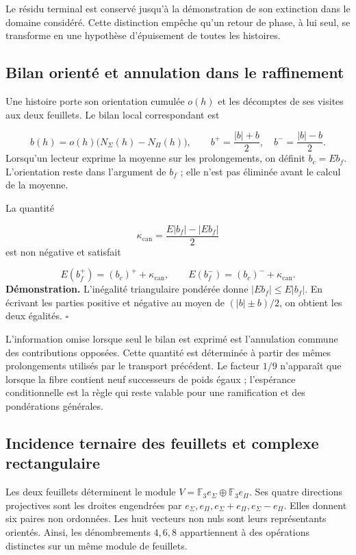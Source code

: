 Le résidu terminal est conservé jusqu'à la démonstration de son extinction dans le domaine considéré. Cette distinction empêche qu'un retour de phase, à lui seul, se transforme en une hypothèse d'épuisement de toutes les histoires.

\subsection{Bilan orienté et annulation dans le raffinement}
Une histoire porte son orientation cumulée \(o(h)\) et les décomptes de ses visites aux deux feuillets. Le bilan local correspondant est

\[
b(h)=o(h)\bigl(N_\Sigma(h)-N_\Pi(h)\bigr),
\qquad
b^+=\frac{|b|+b}{2},\quad b^-=\frac{|b|-b}{2}.
\]
Lorsqu’un lecteur exprime la moyenne sur les prolongements, on définit \(b_c=Eb_f\). L’orientation reste dans l’argument de \(b_f\) ; elle n’est pas éliminée avant le calcul de la moyenne.

La quantité

\[
\kappa_{\mathrm{can}}=
\frac{E|b_f|-|Eb_f|}{2}
\]
est non négative et satisfait

\[
E(b_f^+)=(b_c)^++\kappa_{\mathrm{can}},
\qquad
E(b_f^-)=(b_c)^-+\kappa_{\mathrm{can}}.
\]
\textbf{Démonstration.} L'inégalité triangulaire pondérée donne \(|Eb_f|\leq E|b_f|\). En écrivant les parties positive et négative au moyen de \((|b|\pm b)/2\), on obtient les deux égalités. \hfill\(\square\)

L’information omise lorsque seul le bilan est exprimé est l’annulation commune des contributions opposées. Cette quantité est déterminée à partir des mêmes prolongements utilisés par le transport précédent. Le facteur \(1/9\) n’apparaît que lorsque la fibre contient neuf successeurs de poids égaux ; l’espérance conditionnelle est la règle qui reste valable pour une ramification et des pondérations générales.

\subsection{Incidence ternaire des feuillets et complexe rectangulaire}
Les deux feuillets déterminent le module \(V=\mathbb F_3e_\Sigma\oplus\mathbb F_3e_\Pi\). Ses quatre directions projectives sont les droites engendrées par \(e_\Sigma,e_\Pi,e_\Sigma+e_\Pi,e_\Sigma-e_\Pi\). Elles donnent six paires non ordonnées. Les huit vecteurs non nuls sont leurs représentants orientés. Ainsi, les dénombrements \(4,6,8\) appartiennent à des opérations distinctes sur un même module de feuillets.

